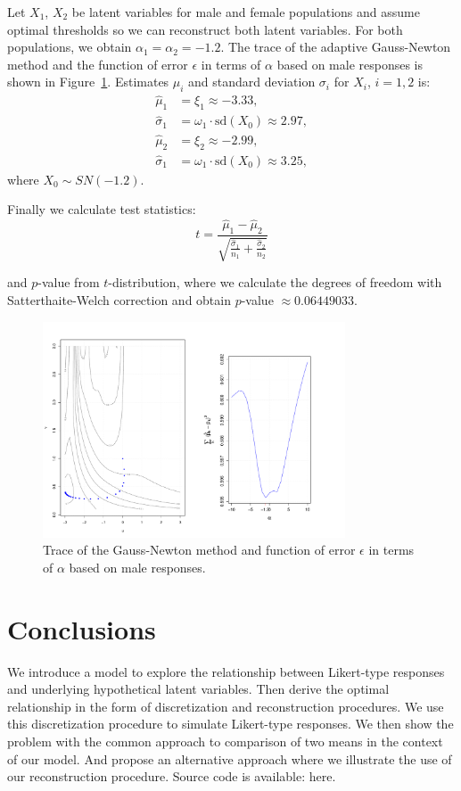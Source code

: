 \documentclass[10pt]{article}
\begin{document}
Let $X_{1}$, $X_{2}$ be latent variables for male and female populations and assume optimal thresholds so we can reconstruct both latent variables. For both populations, we obtain $\alpha_{1} = \alpha_{2} = -1.2$. The trace of the adaptive Gauss-Newton method and the function of error $\epsilon$ in terms of $\alpha$ based on male responses is shown in Figure~\ref{fig: estimates2}. Estimates $\mu_{i}$ and standard deviation $\sigma_{i}$ for $X_{i}$, $i = 1, 2$ is:
\begin{align*}
\hat{\mu}_{1} &= \xi_{1} \approx -3.33, \\
\hat{\sigma}_{1} &= \omega_{1} \cdot \mathrm{sd}(X_{0}) \approx 2.97, \\
\hat{\mu}_{2} &= \xi_{2} \approx -2.99, \\
\hat{\sigma}_{1} &= \omega_{1} \cdot \mathrm{sd}(X_{0}) \approx 3.25,
\end{align*}
where $X_{0} \sim SN(-1.2)$.

Finally we calculate test statistics:
\begin{equation}
t = \frac{\hat{\mu}_{1} - \hat{\mu}_{2}}{
\sqrt{\frac{\hat{\sigma}_{1}}{n_{1}} + \frac{\hat{\sigma}_{2}}{n_{2}}}
}
\end{equation}

and $p$-value from $t$-distribution, where we calculate the degrees of freedom with Satterthaite-Welch correction and obtain $p$-value $\approx 0.06449033$. 

\begin{figure}
\centering
\includegraphics[width=0.8\textwidth]{example_estimation.pdf}
\caption{ Trace of the Gauss-Newton method and function of error $\epsilon$ in terms of $\alpha$ based on male responses.}
\label{fig: estimates2}
\end{figure}

\section{Conclusions}
We introduce a model to explore the relationship between Likert-type responses and underlying hypothetical latent variables. Then derive the optimal relationship in the form of discretization and reconstruction procedures. We use this discretization procedure to simulate Likert-type responses. We then show the problem with the common approach to comparison of two means in the context of our model. And propose an alternative approach where we illustrate the use of our reconstruction procedure. Source code is available: here.



\end{document}
